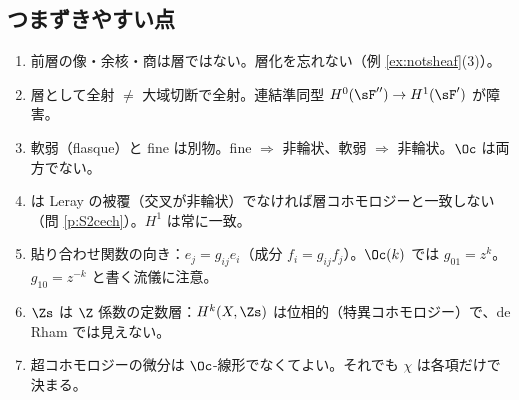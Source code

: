 \subsection*{つまずきやすい点}
\begin{enumerate}
\item 前層の像・余核・商は層ではない。層化を忘れない（例 \ref{ex:notsheaf}(3)）。
\item 層として全射 $\neq$ 大域切断で全射。連結準同型 $H^0(\sF'')\to H^1(\sF')$ が障害。
\item 軟弱（flasque）と fine は別物。fine $\Rightarrow$ 非輪状、軟弱 $\Rightarrow$ 非輪状。$\Oc$ は両方でない。
\item \Cech{} は Leray の被覆（交叉が非輪状）でなければ層コホモロジーと一致しない（問 \ref{p:S2cech}）。$H^1$ は常に一致。
\item 貼り合わせ関数の向き：$e_j=g_{ij}e_i$（成分 $f_i=g_{ij}f_j$）。$\Oc(k)$ では $g_{01}=z^k$。$g_{10}=z^{-k}$ と書く流儀に注意。
\item $\Zs$ は $\Z$ 係数の定数層：$H^k(X,\Zs)$ は位相的（特異コホモロジー）で、de Rham では見えない。
\item 超コホモロジーの微分は $\Oc$-線形でなくてよい。それでも $\chi$ は各項だけで決まる。
\end{enumerate}


